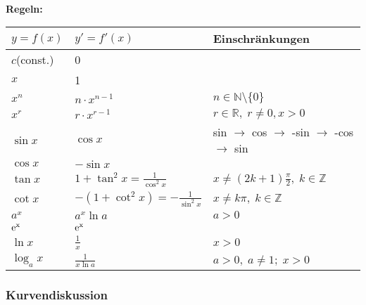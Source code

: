 \documentclass[6pt,a4paper]{scrartcl}
\begin{document}
\begin{multicols*}{2}
\\
\textbf{Regeln:}\\
\begin{tabular}{l|l|l}
$ y=f(x) $		& $ y'=f'(x) $ 								& Einschränkungen 									\\
\hline
$ c $(const.)	& 0 																								\\	
$ x $			& 1																								\\
$ x^n $			& $ n \cdot x^{n-1} $						& $ n \in \mathbb N \setminus \{0\} $ 				\\
$ x^r $			& $ r \cdot x^{r-1} $						& $ r \in \mathbb R, \; r \neq 0, x>0 $ 				\\
$ \sin x $		& $ \cos x $ 								& sin $\rightarrow$ cos $\rightarrow$ -sin $\rightarrow$ -cos $\rightarrow$ sin\\	
$ \cos x $		& $ -\sin x $ 								&													\\
$ \tan x $		& $ 1+ \tan^2 x = \frac{1}{\cos^2 x} $		& $ x \neq (2k+1)\frac{\pi}{2}, \; k \in \mathbb Z $ 	\\
$ \cot x $		& $ -(1+ \cot^2 x) = - \frac{1}{\sin^2 x} $	& $ x \neq k \pi, \; k \in \mathbb Z $ 				\\
$ a^x $			& $ a^x \ln a $								& $ a>0 $ 											\\
$ \rm e^x $		& $ \rm e^x $ 								&													\\	
$ \ln x $		& $ \frac{1}{x} $							& $ x>0 $ 											\\
$ \log_a x $		& $ \frac{1}{x \ln a} $						& $ a>0, \; a \neq 1; \; x>0 $ 						\\
\end{tabular}

\subsubsection{Kurvendiskussion}


\end{multicols*}
\end{document}
